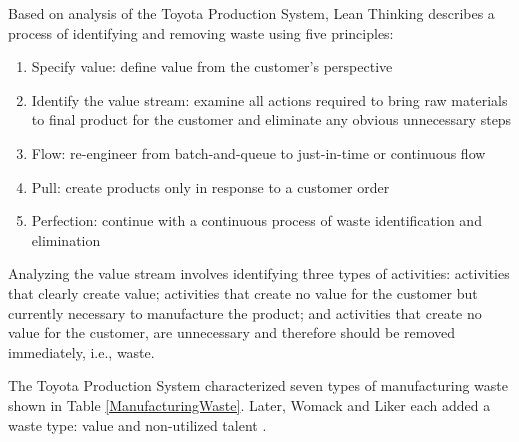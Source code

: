 Based on analysis of the Toyota Production System, Lean Thinking \cite{WomackLeanThinking} describes a process of identifying and removing waste using five principles:
\begin{enumerate}
\item Specify value: define value from the customer's perspective
\item Identify the value stream: examine all actions required to bring raw materials to final product for the customer and eliminate any obvious unnecessary steps
\item Flow: re-engineer from batch-and-queue to just-in-time or continuous flow 
\item Pull: create products only in response to a customer order
\item Perfection: continue with a continuous process of waste identification and elimination
\end{enumerate}

Analyzing the value stream involves identifying three types of activities: activities that clearly create value; activities that create no value for the customer but currently necessary to manufacture the product; and activities that create no value for the customer, are unnecessary and therefore should be removed immediately, i.e., waste.

The Toyota Production System characterized seven types of manufacturing waste \cite{ShingoToyotaProductionSystem} shown in Table \ref{ManufacturingWaste}. Later, Womack and Liker each added a waste type: value and non-utilized talent \cite{WomackLeanThinking, LikerToyotaWay}.

